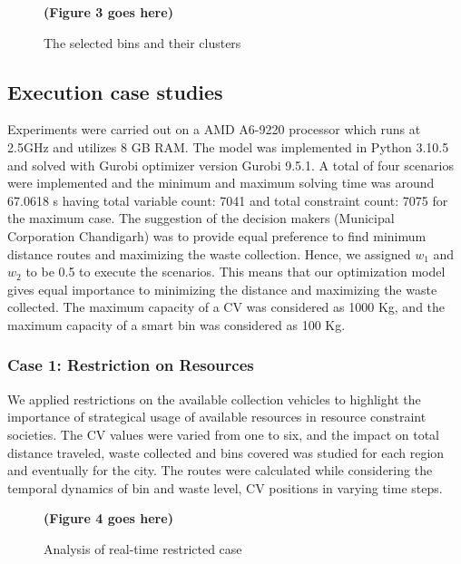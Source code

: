 \documentclass[12pt]{article}
\begin{document}
\begin{figure}[H]
    \centering
    \textbf{(Figure 3 goes here)}
    \caption{The selected bins and their clusters}\label{figm}
\end{figure}

\subsection{Execution case studies}
Experiments were carried out on a AMD A6-9220 processor which runs at 2.5GHz and utilizes 8 GB RAM. The model was implemented in Python 3.10.5 and solved with Gurobi optimizer version Gurobi 9.5.1. A total of four scenarios were implemented and the minimum and maximum solving time was around 67.0618 s having total variable count: 7041 and total constraint count: 7075 for the maximum case.
The suggestion of the decision makers (Municipal Corporation Chandigarh) was to provide equal preference to find minimum distance routes and maximizing the waste collection. Hence, we assigned  $w_1$ and $w_2$ to be 0.5 to execute the scenarios. This means that our optimization model gives equal importance to minimizing the distance and maximizing the waste collected. The maximum capacity of a CV was considered as 1000 Kg, and the maximum capacity of a smart bin was considered as 100 Kg.

\subsubsection*{Case 1: Restriction on Resources}
We applied restrictions on the available collection vehicles to highlight the importance of strategical usage of available resources in resource constraint societies. The CV values were varied from one to six, and the impact on total distance traveled, waste collected and bins covered was studied for each region and eventually for the city. The routes were calculated while considering the temporal dynamics of bin and waste level, CV positions in varying time steps.
\begin{figure}[H]
    \centering
    \textbf{(Figure 4 goes here)}
    \caption{Analysis of real-time restricted case}\label{figcom}
\end{figure}
\end{document}
